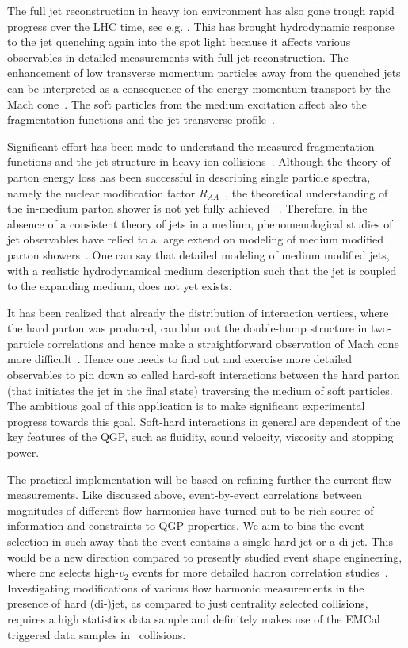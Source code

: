 The full jet reconstruction in heavy ion environment has also gone trough rapid progress over the LHC time, see e.g. \cite{Abelev:2013kqa}. This has brought hydrodynamic response to the jet quenching again into the spot light because it affects various observables in detailed measurements with full jet reconstruction. The enhancement of low transverse momentum particles away from the quenched jets can be interpreted as a consequence of the energy-momentum transport by the Mach cone~\cite{Tachibana:2014lja}. 
The soft particles from the medium excitation affect also the fragmentation functions and the jet transverse profile~\cite{He:2015pra}.

Significant effort has been made to understand the measured fragmentation functions and the jet structure in heavy ion collisions~\cite{Chatrchyan:2011sx,Chatrchyan:2013kwa,Chatrchyan:2014ava,Adam:2015ewa,Khachatryan:2016erx}. Although the theory of parton energy loss has been successful in describing single particle spectra, namely the nuclear modification factor $R_{AA}$~\cite{Aamodt:2010jd}, the theoretical understanding of the in-medium parton shower is not yet fully achieved ~\cite{PhysRevLett.106.122002}. Therefore, in the absence of a consistent theory of jets in a medium, phenomenological studies of jet observables have relied to a large extend on modeling of medium modified parton showers~\cite{Armesto:2008qh,Renk:2010zx}. One can say that detailed modeling of medium modified jets, with a realistic hydrodynamical medium description such that the jet is coupled to the expanding medium, does not yet exists.

It has been realized that already the distribution of interaction vertices, where the hard parton was produced, can blur out the double-hump structure in two-particle correlations and hence make a straightforward observation of Mach cone more difficult~\cite{Tachibana:2015qxa}. Hence one needs to find out and exercise more detailed observables to pin down so called hard-soft interactions between the hard parton (that initiates the jet in the final state) traversing the medium of soft particles. The ambitious goal of this application is to make significant experimental progress towards this goal. Soft-hard interactions in general are dependent of the key features of the QGP, such as fluidity, sound velocity, viscosity and stopping power.

The practical implementation will be based on refining further the current flow measurements. Like discussed above, event-by-event correlations between magnitudes of different flow harmonics have turned out to be rich source of information and constraints to QGP properties. We aim to bias the event selection in such away that the event contains a single hard jet or a di-jet. This would be a new direction compared to presently studied event shape engineering, where one selects high-$v_2$  events for more detailed hadron correlation studies~\cite{ALICE:2016kpq}. Investigating modifications of various flow harmonic measurements in the presence of hard (di-)jet, as compared to just centrality selected collisions, requires a high statistics data sample and definitely makes use of the EMCal triggered data samples in \pbpb\ collisions.

